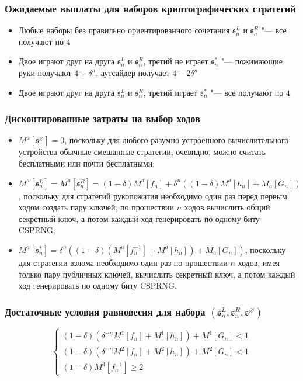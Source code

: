 \begin{frame}
	\frametitle{Ожидаемые выплаты для наборов криптографических стратегий}
	\begin{itemize}
		\item Любые наборы без правильно ориентированного сочетания $\mathfrak{s}^L_n$ и $\mathfrak{s}^R_n$ "--- все получают по $4$
		\item Двое играют друг на друга $\mathfrak{s}^L_n$ и $\mathfrak{s}^R_n$, третий не играет $\mathfrak{s}^*_n$ "--- пожимающие руки получают $4 + \delta^n$, аутсайдер получает $4 - 2 \delta^n$
		\item Двое играют друг на друга $\mathfrak{s}^L_n$ и $\mathfrak{s}^R_n$, третий играет $\mathfrak{s}^*_n$ "--- все получают по $4$
	\end{itemize}
\end{frame}

\begin{frame}
	\frametitle{Дисконтированные затраты на выбор ходов}
	\begin{itemize}
		\item $M^a[\mathfrak{s}^{\varnothing}] = 0$, поскольку для любого разумно устроенного вычислительного устройства обычные смешанные стратегии, очевидно, можно считать бесплатными или почти бесплатными;
		\item $M^a[\mathfrak{s}^L_n] = M^a[\mathfrak{s}^R_n] = (1 - \delta) M^a[f_n] + \delta ^ n ((1 - \delta) M^a[h_n] + M_a[G_n])$, поскольку для стратегий рукопожатия необходимо один раз перед первым ходом создать пару ключей, по прошествии $n$ ходов вычислить общий секретный ключ, а потом каждый ход генерировать по одному биту CSPRNG;
		\item $M^a[\mathfrak{s}^*_n] = \delta ^ n ((1 - \delta) (M^a[f_n^{-1}] + M^a[h_n]) + M_a[G_n])$, поскольку для стратегии взлома необходимо один раз по прошествии $n$ ходов, имея только пару публичных ключей, вычислить секретный ключ, а потом каждый ход генерировать по одному биту CSPRNG.
	\end{itemize}
\end{frame}

\begin{frame}
	\frametitle{Достаточные условия равновесия для набора $(\mathfrak{s}^L_n, \mathfrak{s}^R_n, \mathfrak{s}^{\varnothing})$}
	\begin{equation*}
		\begin{cases}
			(1 - \delta)(\delta^{-n} M^1[f_n] + M^1[h_n]) + M^1[G_n] < 1 \\
			(1 - \delta)(\delta^{-n} M^2[f_n] + M^2[h_n]) + M^2[G_n] < 1 \\
			(1 - \delta) M^3[f_n^{-1}] \ge 2
		\end{cases}
	\end{equation*}
\end{frame}

